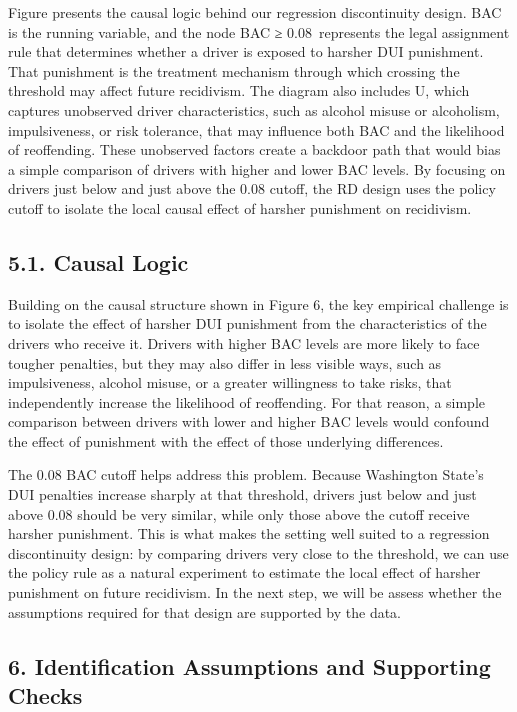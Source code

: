 \documentclass[
  letterpaper,
  DIV=11,
  numbers=noendperiod]{scrartcl}
\begin{document}
Figure presents the causal logic behind our regression discontinuity
design. BAC is the running variable, and the node BAC ≥ 0.08~represents
the legal assignment rule that determines whether a driver is exposed to
harsher DUI punishment. That punishment is the treatment mechanism
through which crossing the threshold may affect future recidivism. The
diagram also includes U, which captures unobserved driver
characteristics, such as alcohol misuse or alcoholism, impulsiveness, or
risk tolerance, that may influence both BAC and the likelihood of
reoffending. These unobserved factors create a backdoor path that would
bias a simple comparison of drivers with higher and lower BAC levels. By
focusing on drivers just below and just above the 0.08 cutoff, the RD
design uses the policy cutoff to isolate the local causal effect of
harsher punishment on recidivism.

\subsection{5.1. Causal Logic}\label{causal-logic}

Building on the causal structure shown in Figure 6, the key empirical
challenge is to isolate the effect of harsher DUI punishment from the
characteristics of the drivers who receive it. Drivers with higher BAC
levels are more likely to face tougher penalties, but they may also
differ in less visible ways, such as impulsiveness, alcohol misuse, or a
greater willingness to take risks, that independently increase the
likelihood of reoffending. For that reason, a simple comparison between
drivers with lower and higher BAC levels would confound the effect of
punishment with the effect of those underlying differences.

The 0.08 BAC cutoff helps address this problem. Because Washington
State's DUI penalties increase sharply at that threshold, drivers just
below and just above 0.08 should be very similar, while only those above
the cutoff receive harsher punishment. This is what makes the setting
well suited to a regression discontinuity design: by comparing drivers
very close to the threshold, we can use the policy rule as a natural
experiment to estimate the local effect of harsher punishment on future
recidivism. In the next step, we will be assess whether the assumptions
required for that design are supported by the data.

\subsection{6. Identification Assumptions and Supporting
Checks}\label{identification-assumptions-and-supporting-checks}
\end{document}
